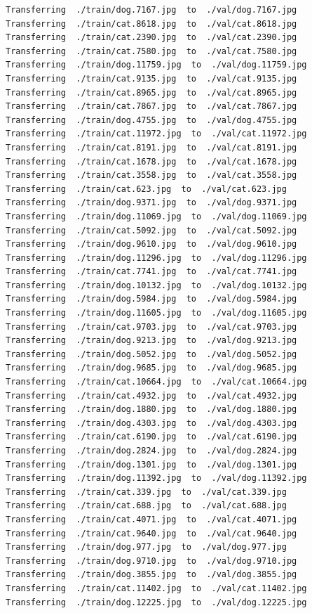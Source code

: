 \documentclass[]{book}
\theoremstyle{definition}
\theoremstyle{definition}
\theoremstyle{definition}
\theoremstyle{remark}
\begin{document}
\begin{verbatim}
Transferring  ./train/dog.7167.jpg  to  ./val/dog.7167.jpg
Transferring  ./train/cat.8618.jpg  to  ./val/cat.8618.jpg
Transferring  ./train/cat.2390.jpg  to  ./val/cat.2390.jpg
Transferring  ./train/cat.7580.jpg  to  ./val/cat.7580.jpg
Transferring  ./train/dog.11759.jpg  to  ./val/dog.11759.jpg
Transferring  ./train/cat.9135.jpg  to  ./val/cat.9135.jpg
Transferring  ./train/cat.8965.jpg  to  ./val/cat.8965.jpg
Transferring  ./train/cat.7867.jpg  to  ./val/cat.7867.jpg
Transferring  ./train/dog.4755.jpg  to  ./val/dog.4755.jpg
Transferring  ./train/cat.11972.jpg  to  ./val/cat.11972.jpg
Transferring  ./train/cat.8191.jpg  to  ./val/cat.8191.jpg
Transferring  ./train/cat.1678.jpg  to  ./val/cat.1678.jpg
Transferring  ./train/cat.3558.jpg  to  ./val/cat.3558.jpg
Transferring  ./train/cat.623.jpg  to  ./val/cat.623.jpg
Transferring  ./train/dog.9371.jpg  to  ./val/dog.9371.jpg
Transferring  ./train/dog.11069.jpg  to  ./val/dog.11069.jpg
Transferring  ./train/cat.5092.jpg  to  ./val/cat.5092.jpg
Transferring  ./train/dog.9610.jpg  to  ./val/dog.9610.jpg
Transferring  ./train/dog.11296.jpg  to  ./val/dog.11296.jpg
Transferring  ./train/cat.7741.jpg  to  ./val/cat.7741.jpg
Transferring  ./train/dog.10132.jpg  to  ./val/dog.10132.jpg
Transferring  ./train/dog.5984.jpg  to  ./val/dog.5984.jpg
Transferring  ./train/dog.11605.jpg  to  ./val/dog.11605.jpg
Transferring  ./train/cat.9703.jpg  to  ./val/cat.9703.jpg
Transferring  ./train/dog.9213.jpg  to  ./val/dog.9213.jpg
Transferring  ./train/dog.5052.jpg  to  ./val/dog.5052.jpg
Transferring  ./train/dog.9685.jpg  to  ./val/dog.9685.jpg
Transferring  ./train/cat.10664.jpg  to  ./val/cat.10664.jpg
Transferring  ./train/cat.4932.jpg  to  ./val/cat.4932.jpg
Transferring  ./train/dog.1880.jpg  to  ./val/dog.1880.jpg
Transferring  ./train/dog.4303.jpg  to  ./val/dog.4303.jpg
Transferring  ./train/cat.6190.jpg  to  ./val/cat.6190.jpg
Transferring  ./train/dog.2824.jpg  to  ./val/dog.2824.jpg
Transferring  ./train/dog.1301.jpg  to  ./val/dog.1301.jpg
Transferring  ./train/dog.11392.jpg  to  ./val/dog.11392.jpg
Transferring  ./train/cat.339.jpg  to  ./val/cat.339.jpg
Transferring  ./train/cat.688.jpg  to  ./val/cat.688.jpg
Transferring  ./train/cat.4071.jpg  to  ./val/cat.4071.jpg
Transferring  ./train/cat.9640.jpg  to  ./val/cat.9640.jpg
Transferring  ./train/dog.977.jpg  to  ./val/dog.977.jpg
Transferring  ./train/dog.9710.jpg  to  ./val/dog.9710.jpg
Transferring  ./train/dog.3855.jpg  to  ./val/dog.3855.jpg
Transferring  ./train/cat.11402.jpg  to  ./val/cat.11402.jpg
Transferring  ./train/dog.12225.jpg  to  ./val/dog.12225.jpg

\end{verbatim}
\end{document}
